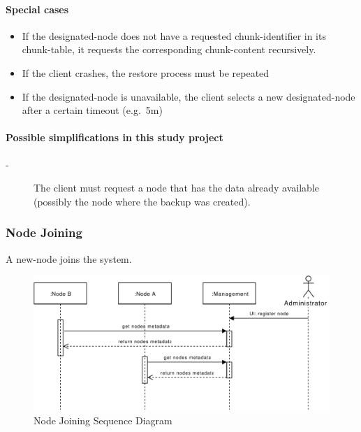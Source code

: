 \paragraph{Special cases}
\begin{itemize}
    \item If the \gls{designated-node} does not have a requested \gls{chunk-identifier} in its \gls{chunk-table}, it requests the corresponding \gls{chunk-content} recursively.
    \item If the \gls{client} crashes, the restore process must be repeated
    \item If the \gls{designated-node} is unavailable, the \gls{client} selects a new \gls{designated-node} after a certain timeout (e.g.\ 5m)
\end{itemize}

\paragraph{Possible simplifications in this study project}
\begin{description}
    \item[-] The client must request a node that has the data already available (possibly the node where the backup was created).
\end{description}


\subsubsection{Node Joining}\label{sec:scenario-node-join}
A \gls{new-node} joins the system.

\begin{figure}[h]
    \centering
    \includegraphics[width=\linewidth]{resources/node_joining.pdf}
    \caption{Node Joining Sequence Diagram}
    \label{fig:node-joining}
\end{figure}

